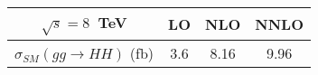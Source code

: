 \begin{tabular}{c|ccc}
$\sqrt{s} = 8$~TeV & LO & NLO & NNLO \\
\hline
$\sigma_{SM}(gg\rightarrow HH)$ (fb) & 3.6 & 8.16 & 9.96
\end{tabular}
